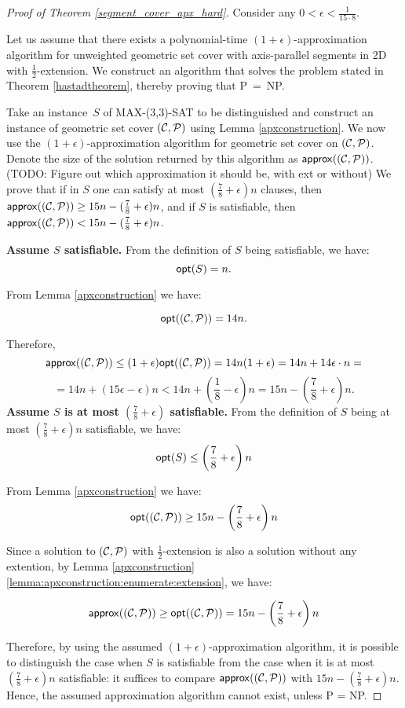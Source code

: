 \begin{proof}[Proof of Theorem \ref{segment_cover_apx_hard}]
Consider any $0 < \epsilon < \frac{1}{15 \cdot 8}$.

Let us assume that there exists a polynomial-time
$(1+\epsilon)$-approximation algorithm
for unweighted geometric set cover with axis-parallel segments in 2D
with $\frac{1}{2}$-extension.
We construct an algorithm that solves the problem stated in 
Theorem \ref{hastadtheorem}, thereby proving that P~=~NP.

Take an instance~$S$ of MAX-(3,3)-SAT to be distinguished
and construct an instance of geometric set cover $(\mathcal{C}, \mathcal{P})$
using Lemma \ref{apxconstruction}.
We now use the $(1+\epsilon)$-approximation algorithm
for geometric set cover on $(\mathcal{C}, \mathcal{P})$.
Denote the size of the solution returned by this algorithm as $\mathsf{approx}((\mathcal{C}, \mathcal{P}))$.
(TODO: Figure out which approximation it should be, with ext or without)
We prove that 
if in $S$
one can satisfy at most $(\frac{7}{8}+\epsilon)n$ clauses,
then $\mathsf{approx}((\mathcal{C}, \mathcal{P})) \ge 15n - (\frac{7}{8} + \epsilon)n$,
and if $S$ is
satisfiable, then $\mathsf{approx}((\mathcal{C}, \mathcal{P})) < 15n - (\frac{7}{8} + \epsilon)n$.


\textbf{Assume $S$ satisfiable.}
From the definition of $S$ being satisfiable, we have:
$$\mathsf{opt}(S) = n.$$

From Lemma \ref{apxconstruction} we have:

$$\mathsf{opt}((\mathcal{C}, \mathcal{P})) = 14n.$$

Therefore,
$$\mathsf{approx}((\mathcal{C}, \mathcal{P})) \le (1+\epsilon)\mathsf{opt}((\mathcal{C}, \mathcal{P})) = 14n(1+\epsilon)
	= 14n + 14\epsilon\cdot n =$$ 
	$$= 14n + (15\epsilon - \epsilon)n < 
  14n + \left(\frac{1}{8} - \epsilon\right)n 
= 15n - \left(\frac{7}{8} + \epsilon\right)n.$$
\textbf{Assume $S$ is at most 
$\left(\frac{7}{8} + \epsilon\right)$ satisfiable.}
From the definition of $S$ being at most 
$\left(\frac{7}{8} + \epsilon\right)n$ satisfiable, we have:
$$\mathsf{opt}(S) \le \left(\frac{7}{8} + \epsilon\right)n$$

From Lemma \ref{apxconstruction} we have:
$$\mathsf{opt}((\mathcal{C}, \mathcal{P})) \ge 15n - \left(\frac{7}{8} + \epsilon\right)n$$

Since a solution to $(\mathcal{C}, \mathcal{P})$ with $\frac{1}{2}$-extension is
also a solution without any extention, by 
Lemma \ref{apxconstruction} \ref{lemma:apxconstruction:enumerate:extension}, we have:

$$\mathsf{approx}((\mathcal{C}, \mathcal{P})) \ge \mathsf{opt}((\mathcal{C}, \mathcal{P})) = 15n - \left(\frac{7}{8} + \epsilon\right)n$$


Therefore, by using the assumed $(1+\epsilon)$-approximation
algorithm,
it is possible to distinguish the case when
$S$ is satisfiable from the case when it is
at most $(\frac{7}{8} + \epsilon)n$ satisfiable:
it suffices to compare $\mathsf{approx}((\mathcal{C}, \mathcal{P}))$ with $15n - (\frac{7}{8}+\epsilon)n$.
Hence, the assumed approximation algorithm cannot exist, unless P = NP.
\end{proof}

